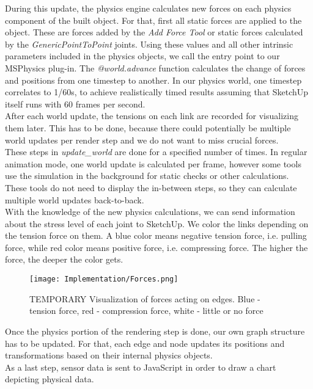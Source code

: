 During this update, the physics engine calculates new forces on each physics component of the built object. For that, first all static forces are applied to the object. These are forces added by the \textit{Add Force Tool} or static forces calculated by the \textit{GenericPointToPoint} joints. Using these values and all other intrinsic parameters included in the physics objects, we call the entry point to our MSPhysics plug-in. The \textit{@world.advance} function calculates the change of forces and positions from one timestep to another. In our physics world, one timestep correlates to 1/60s, to achieve realistically timed results assuming that SketchUp itself runs with 60 frames per second.\\
After each world update, the tensions on each link are recorded for visualizing them later. This has to be done, because there could potentially be multiple world updates per render step and we do not want to miss crucial forces.\\
These steps in \textit{update\_world} are done for a specified number of times. In regular animation mode, one world update is calculated per frame, however some tools use the simulation in the background for static checks or other calculations. These tools do not need to display the in-between steps, so they can calculate multiple world updates back-to-back.\\
With the knowledge of the new physics calculations, we can send information about the stress level of each joint to SketchUp. We color the links depending on the tension force on them. A blue color means negative tension force, i.e. pulling force, while red color means positive force, i.e. compressing force. The higher the force, the deeper the color gets.\\
\begin{figure}[h!]
    \texttt{[image: Implementation/Forces.png]}
    \centering
    \caption{TEMPORARY Visualization of forces acting on edges. Blue - tension force, red - compression force, white - little or no force}
    \label{fig:force_visualization}
\end{figure}
Once the physics portion of the rendering step is done, our own graph structure has to be updated. For that, each edge and node updates its positions and transformations based on their internal physics objects.\\
As a last step, sensor data is sent to JavaScript in order to draw a chart depicting physical data.

